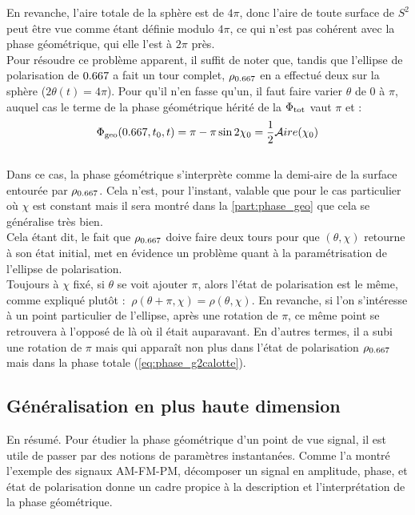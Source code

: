 En revanche, l'aire totale de la sphère est de $4\pi$, donc l'aire de toute surface de $S^2$ peut être vue comme étant définie modulo $4\pi$, ce qui n'est pas cohérent avec la phase géométrique, qui elle l'est à $2\pi$ près.
\\
Pour résoudre ce problème apparent, il suffit de noter que, tandis que l’ellipse de polarisation de $\x$ a fait un tour complet, 
$\rho_{\x}$ en a effectué deux sur la sphère ($2\theta(t) = 4\pi$).
Pour qu'il n'en fasse qu'un, il faut faire varier $\theta$ de 0 à $\pi$, auquel cas le terme de la phase géométrique hérité de la $\Phi_{\text{\normalfont tot}}$ vaut $\pi$ et :
\begin{equation} \label{eq:phase_g2calotte}
\phaseg(\x, t_0, t) = \pi - \pi\sin 2\chi_0 = \frac{1}{2}\mathcal{A}ire(\chi_0)
\end{equation}
\\
Dans ce cas, la phase géométrique s'interprète comme la demi-aire de la surface entourée par $\rho_{\x}$. Cela n'est, pour l'instant, valable que pour le cas particulier où $\chi$ est constant mais il sera montré dans la \cref{part:phase_geo} que cela se généralise très bien.
\\

Cela étant dit, le fait que $\rho_{\x}$ doive faire deux tours pour que $(\theta,\chi)$ retourne à son état initial, met en évidence un problème quant à la paramétrisation de l'ellipse de polarisation.
\\
Toujours à $\chi$ fixé, si $\theta$ se voit ajouter $\pi$, alors l'état de polarisation est le même, comme expliqué plutôt : $\ \rho(\theta+\pi,\chi) = \rho(\theta, \chi)$.
En revanche, si l'on s'intéresse à un point particulier de l'ellipse, après une rotation de $\pi$, ce même point se retrouvera à l'opposé de là où il était auparavant. 
En d'autres termes, il a subi une rotation de $\pi$ mais qui apparaît non plus dans l'état de polarisation $\rho_{\x}$ mais dans la phase totale (\cref{eq:phase_g2calotte}).
\\




\subsection{Généralisation en plus haute dimension} \label{subsec:aller_plus_loin}

En résumé. Pour étudier la phase géométrique d'un point de vue signal, il est utile de passer par des notions de paramètres instantanées. Comme l'a montré l'exemple des signaux AM-FM-PM, décomposer un signal en amplitude, phase, et état de polarisation donne un cadre propice à la description et l'interprétation de la phase géométrique.
\\

